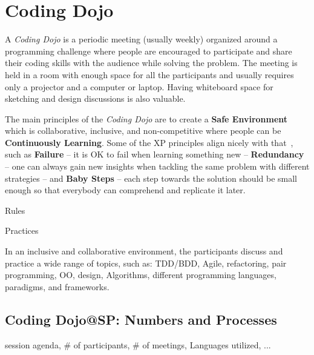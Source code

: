 \section{Coding Dojo}\label{sec:dojo}

A \emph{Coding Dojo} is a periodic meeting (usually weekly) organized around a programming challenge
where people are encouraged to participate and share their coding skills with the audience while
solving the problem. The meeting is held in a room with enough space for all the participants and
usually requires only a projector and a computer or laptop. Having whiteboard space for sketching
and design discussions is also valuable.

The main principles of the \emph{Coding Dojo} are to create a \textbf{Safe Environment} which is
collaborative, inclusive, and non-competitive where people can be \textbf{Continuously Learning}.
Some of the XP principles align nicely with that~\cite{XP2E}, such as \textbf{Failure} -- it is OK
to fail when learning something new -- \textbf{Redundancy} -- one can always gain new insights
when tackling the same problem with different strategies -- and \textbf{Baby Steps} -- each step
towards the solution should be small enough so that everybody can comprehend and replicate it later.

Rules

Practices

In an inclusive and collaborative environment, the participants discuss and
practice a wide range of topics, such as: TDD/BDD, Agile, refactoring, pair programming, OO, design, Algorithms, different programming languages, paradigms, and frameworks.

\cite{DojoWiki}

\subsection{Coding Dojo@SP: Numbers and Processes}\label{subsec:dojosp}

session agenda, \# of participants, \# of meetings, Languages utilized, ...


